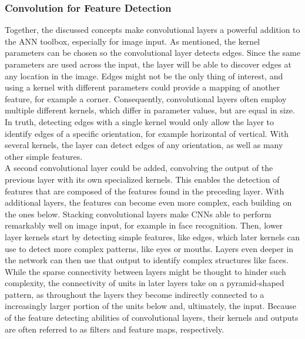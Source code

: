 \subsubsection{Convolution for Feature Detection}

Together, the discussed concepts make convolutional layers a powerful addition to the ANN toolbox, especially for image input. As mentioned, the kernel parameters can be chosen so the convolutional layer detects edges. Since the same parameters are used across the input, the layer will be able to discover edges at any location in the image. Edges might not be the only thing of interest, and using a kernel with different parameters could provide a mapping of another feature, for example a corner. Consequently, convolutional layers often employ multiple different kernels, which differ in parameter values, but are equal in size. In truth, detecting edges with a single kernel would only allow the layer to identify edges of a specific orientation, for example horizontal of vertical. With several kernels, the layer can detect edges of any orientation, as well as many other simple features. \\

\noindent A second convolutional layer could be added, convolving the output of the previous layer with its own specialized kernels. This enables the detection of features that are composed of the features found in the preceding layer. With additional layers, the features can become even more complex, each building on the ones below. Stacking convolutional layers make CNNs able to perform remarkably well on image input, for example in face recognition. Then, lower layer kernels start by detecting simple features, like edges, which later kernels can use to detect more complex patterns, like eyes or mouths. Layers even deeper in the network can then use that output to identify complex structures like faces. While the sparse connectivity between layers might be thought to hinder such complexity, the connectivity of units in later layers take on a pyramid-shaped pattern, as throughout the layers they become indirectly connected to a increasingly larger portion of the units below and, ultimately, the input. Because of the feature detecting abilities of convolutional layers, their kernels and outputs are often referred to as filters and feature maps, respectively. \\

